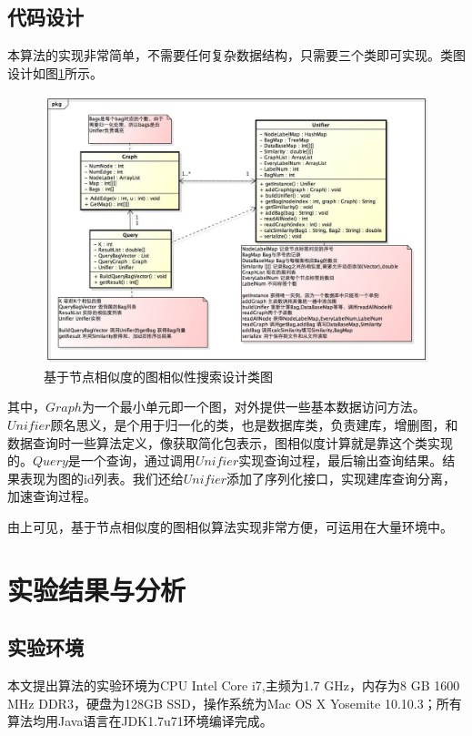 \documentclass{XDBAthesis}
\begin{document}
\subsection{代码设计}
本算法的实现非常简单，不需要任何复杂数据结构，只需要三个类即可实现。类图设计如图\ref{fg:ghashdesign}所示。
\begin{figure}
    \includegraphics[width=\textwidth ]{../figures/G-Hash-pkg}
    \caption{基于节点相似度的图相似性搜索设计类图}
    \label{fg:ghashdesign}
\end{figure}

其中，$Graph$为一个最小单元即一个图，对外提供一些基本数据访问方法。$Unifier$顾名思义，是个用于归一化的类，也是数据库类，负责建库，增删图，和数据查询时一些算法定义，像获取简化包表示，图相似度计算就是靠这个类实现的。$Query$是一个查询，通过调用$Unifier$实现查询过程，最后输出查询结果。结果表现为图的id列表。我们还给$Unifier$添加了序列化接口，实现建库查询分离，加速查询过程。

由上可见，基于节点相似度的图相似算法实现非常方便，可运用在大量环境中。


\section{实验结果与分析}
\subsection{实验环境}
本文提出算法的实验环境为CPU Intel Core i7,主频为1.7 GHz，内存为8 GB 1600 MHz DDR3，硬盘为128GB SSD，操作系统为Mac OS X Yosemite 10.10.3；所有算法均用Java语言在JDK1.7u71环境编译完成。
\end{document}
